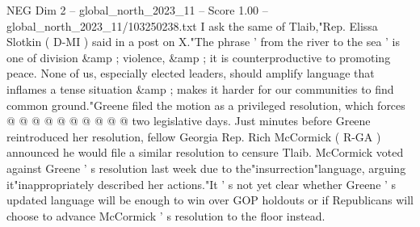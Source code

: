 \begin{textsample}{NEG Dim 2 – global\_north\_2023\_11 – Score 1.00 – global\_north\_2023\_11/103250238.txt}
I ask the same of Tlaib,"Rep.
Elissa Slotkin ( D-MI ) said in a post on X."The phrase ' from the river to the sea ' is one of division \&amp ; violence, \&amp ; it is counterproductive to promoting peace.
None of us, especially elected leaders, should amplify language that inflames a tense situation \&amp ; makes it harder for our communities to find common ground."Greene filed the motion as a privileged resolution, which forces @ @ @ @ @ @ @ @ @ @ two legislative days.
Just minutes before Greene reintroduced her resolution, fellow Georgia Rep.
Rich McCormick ( R-GA ) announced he would file a similar resolution to censure Tlaib.
McCormick voted against Greene ' s resolution last week due to the"insurrection"language, arguing it"inappropriately described her actions."It ' s not yet clear whether Greene ' s updated language will be enough to win over GOP holdouts or if Republicans will choose to advance McCormick ' s resolution to the floor instead.

\end{textsample}
